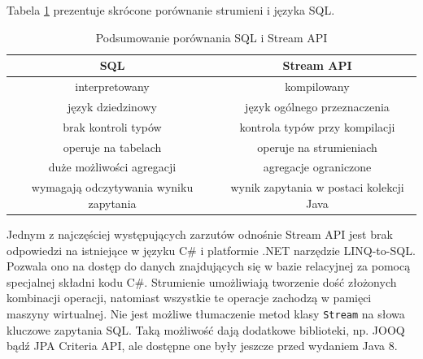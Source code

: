\documentclass[12pt,twoside,openright]{extarticle}
\begin{document}
    Tabela \ref{comparison} prezentuje skrócone porównanie strumieni i języka SQL.

\begin{table}[h]
    \begin{center}
        \begin{tabular}{ |c|c| }
            \hline
            \textbf{SQL} & \textbf{Stream API} \\
            \hline

            interpretowany & kompilowany \\
            \hline

            język dziedzinowy & język ogólnego przeznaczenia \\
            \hline

            brak kontroli typów & kontrola typów przy kompilacji \\
            \hline

            operuje na tabelach & operuje na strumieniach \\
            \hline

            duże możliwości agregacji & agregacje ograniczone \\
            \hline

            wymagają odczytywania wyniku zapytania & wynik zapytania w postaci kolekcji Java \\
            \hline
        \end{tabular}

        \caption{Podsumowanie porównania SQL i Stream API}
        \label{comparison}
    \end{center}
\end{table}


    Jednym z najczęściej występujących zarzutów odnośnie Stream API jest brak odpowiedzi na istniejące w języku C\# i platformie .NET narzędzie LINQ-to-SQL. Pozwala ono na dostęp do danych znajdujących się w bazie relacyjnej za pomocą specjalnej składni kodu C\#. Strumienie umożliwiają tworzenie dość złożonych kombinacji operacji, natomiast wszystkie te operacje zachodzą w pamięci maszyny wirtualnej. Nie jest możliwe tłumaczenie metod klasy \texttt{Stream} na słowa kluczowe zapytania SQL. Taką możliwość dają dodatkowe biblioteki, np. JOOQ bądź JPA Criteria API, ale dostępne one były jeszcze przed wydaniem Java 8. 
\end{document}
